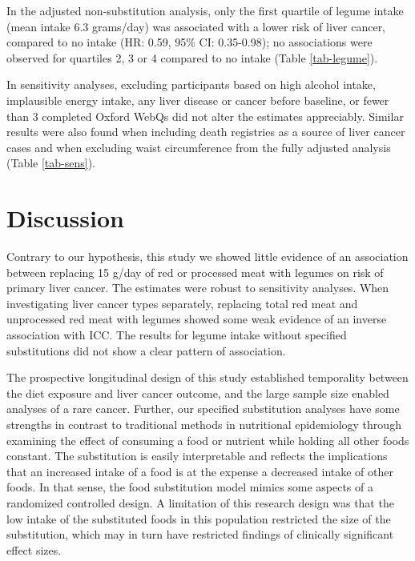 \documentclass[nutrients,article,submit,moreauthors,pdftex]{Definitions/mdpi}
\begin{document}
In the adjusted non-substitution analysis, only the first quartile of
legume intake (mean intake 6.3 grams/day) was associated with a lower
risk of liver cancer, compared to no intake (HR: 0.59, 95\% CI:
0.35-0.98); no associations were observed for quartiles 2, 3 or 4
compared to no intake (Table \ref{tab-legume}).

In sensitivity analyses, excluding participants based on high alcohol
intake, implausible energy intake, any liver disease or cancer before
baseline, or fewer than 3 completed Oxford WebQs did not alter the
estimates appreciably. Similar results were also found when including
death registries as a source of liver cancer cases and when excluding
waist circumference from the fully adjusted analysis (Table
\ref{tab-sens}).

\hypertarget{sec4}{%
\section{Discussion}\label{sec4}}

Contrary to our hypothesis, this study we showed little evidence of an
association between replacing 15 g/day of red or processed meat with
legumes on risk of primary liver cancer. The estimates were robust to
sensitivity analyses. When investigating liver cancer types separately,
replacing total red meat and unprocessed red meat with legumes showed
some weak evidence of an inverse association with ICC. The results for
legume intake without specified substitutions did not show a clear
pattern of association.

The prospective longitudinal design of this study established
temporality between the diet exposure and liver cancer outcome, and the
large sample size enabled analyses of a rare cancer. Further, our
specified substitution analyses have some strengths in contrast to
traditional methods in nutritional epidemiology through examining the
effect of consuming a food or nutrient while holding all other foods
constant. The substitution is easily interpretable and reflects the
implications that an increased intake of a food is at the expense a
decreased intake of other foods. In that sense, the food substitution
model mimics some aspects of a randomized controlled design. A
limitation of this research design was that the low intake of the
substituted foods in this population restricted the size of the
substitution, which may in turn have restricted findings of clinically
significant effect sizes.
\end{document}
